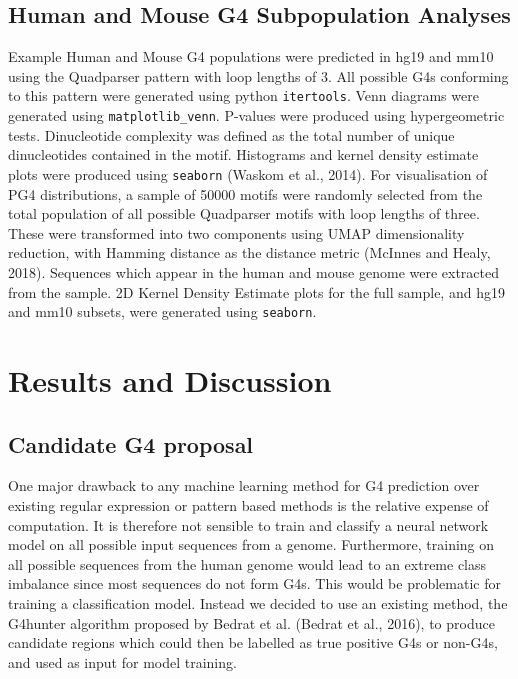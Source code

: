 \documentclass[12pt,a4paper,]{report}
\begin{document}
\hypertarget{human-and-mouse-g4-subpopulation-analyses}{%
\subsection{Human and Mouse G4 Subpopulation
Analyses}\label{human-and-mouse-g4-subpopulation-analyses}}

Example Human and Mouse G4 populations were predicted in hg19 and mm10
using the Quadparser pattern with loop lengths of 3. All possible G4s
conforming to this pattern were generated using python
\texttt{itertools}. Venn diagrams were generated using
\texttt{matplotlib\_venn}. P-values were produced using hypergeometric
tests. Dinucleotide complexity was defined as the total number of unique
dinucleotides contained in the motif. Histograms and kernel density
estimate plots were produced using \texttt{seaborn} (Waskom et al.,
2014). For visualisation of PG4 distributions, a sample of 50000 motifs
were randomly selected from the total population of all possible
Quadparser motifs with loop lengths of three. These were transformed
into two components using UMAP dimensionality reduction, with Hamming
distance as the distance metric (McInnes and Healy, 2018). Sequences
which appear in the human and mouse genome were extracted from the
sample. 2D Kernel Density Estimate plots for the full sample, and hg19
and mm10 subsets, were generated using \texttt{seaborn}.

\newpage

\hypertarget{results-and-discussion}{%
\section{Results and Discussion}\label{results-and-discussion}}

\hypertarget{candidate-g4-proposal}{%
\subsection{Candidate G4 proposal}\label{candidate-g4-proposal}}

One major drawback to any machine learning method for G4 prediction over
existing regular expression or pattern based methods is the relative
expense of computation. It is therefore not sensible to train and
classify a neural network model on all possible input sequences from a
genome. Furthermore, training on all possible sequences from the human
genome would lead to an extreme class imbalance since most sequences do
not form G4s. This would be problematic for training a classification
model. Instead we decided to use an existing method, the G4hunter
algorithm proposed by Bedrat et al. (Bedrat et al., 2016), to produce
candidate regions which could then be labelled as true positive G4s or
non-G4s, and used as input for model training.
\end{document}
